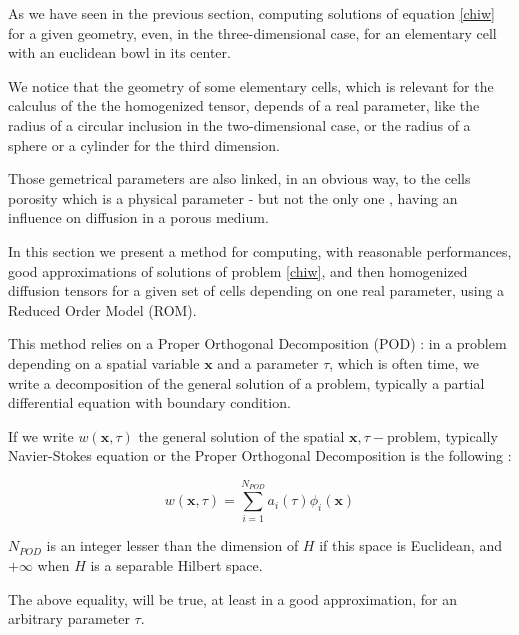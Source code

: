 As we have seen in the previous section, computing solutions of equation \ref{chiw} for a given geometry, %
even, in the three-dimensional case, for an elementary cell with an euclidean bowl in its center.

\par
We notice that the geometry of some elementary cells, which is relevant for the calculus of the the homogenized tensor, %
depends of a real parameter, like the radius of a circular inclusion in the two-dimensional case, %
or the radius of a sphere or a cylinder for the third dimension.

\par
Those gemetrical parameters are also linked, in an obvious way, to the cells porosity which is a physical parameter - but not the only one , %
having an influence on diffusion in a porous medium.

\par
In this section we present a method for computing, with reasonable performances, good approximations of solutions of problem \ref{chiw}, %
and then homogenized diffusion tensors for a given set of cells depending on one real parameter, using a Reduced Order Model (ROM).

\etoile
This method relies on a Proper Orthogonal Decomposition (POD) : in a problem depending on a spatial variable $\mathbf{x}$ and a parameter $\tau$, %
which is often time, we write a decomposition of the general solution of a problem, typically a partial differential equation with boundary condition.

\par
If we write $w(\mathbf{x},\tau)$ the general solution of the spatial $\mathbf{x},\tau-$problem, typically Navier-Stokes equation or %
the Proper Orthogonal Decomposition is the following :

\begin{equation}\label{POD}
w(\mathbf{x},\tau)=\sum\limits_{i=1}^{N_{POD}} a_i(\tau)\phi_i(\mathbf{x})
\end{equation}

$N_{POD}$ is an integer lesser than the dimension of $H$ if this space is Euclidean, %
and $+\infty$ when $H$ is a separable Hilbert space.

\par
The above equality, will be true, at least in a good approximation, for an arbitrary parameter $\tau$.


